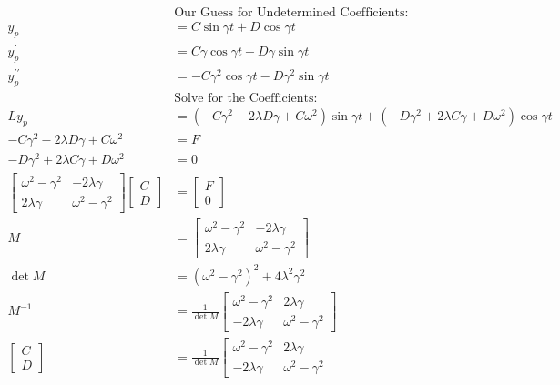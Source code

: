 \documentclass[fleqn,letterpaper]{report}
\begin{document}
\begin{align*}
& \text{Our Guess for Undetermined Coefficients:} \\
y_p & = C \sin \gamma t + D \cos \gamma t \\
y_p^\prime & = C \gamma \cos \gamma t - D \gamma \sin \gamma t
\\
y_p^{\prime \prime} & = - C \gamma^2 \cos \gamma t - D \gamma^2
\sin \gamma t \\
& \text{Solve for the Coefficients:} \\
Ly_p & = (-C\gamma^2 - 2\lambda D \gamma + C \omega^2) \sin
\gamma t + (-D\gamma^2 + 2\lambda C \gamma + D \omega^2) \cos
\gamma t\\
-C\gamma^2 - 2\lambda D\gamma + C \omega^2 & = F \\
-D\gamma^2 + 2\lambda C\gamma + D \omega^2 & = 0 \\
\left[ \begin{matrix} \omega^2 - \gamma^2 & -2\lambda \gamma \\
2\lambda \gamma & \omega^2 - \gamma^2 \end{matrix} \right]
\left[ \begin{matrix} C \\ D \end{matrix} \right] & = 
\left[ \begin{matrix} F \\ 0 \end{matrix} \right] \\
M & = \left[ \begin{matrix} \omega^2 - \gamma^2 & -2\lambda \gamma \\
2\lambda \gamma & \omega^2 - \gamma^2 \end{matrix} \right] \\
\det M & = (\omega^2 - \gamma^2)^2 + 4 \lambda^2 \gamma^2 \\
M^{-1} & = \frac{1}{ \det M} \left[ \begin{matrix} \omega^2 -
\gamma^2 & 2 \lambda \gamma \\ -2 \lambda \gamma & \omega^2 -
\gamma^2 \end{matrix} \right] \\
\left[ \begin{matrix} C \\ D \end{matrix} \right] & = 
\frac{1}{\det M} \left[ \begin{matrix} \omega^2 - \gamma^2 & 2 \lambda
\gamma \\ -2 \lambda \gamma & \omega^2 - \gamma^2 \end{matrix}

\end{align*}
\end{document}

